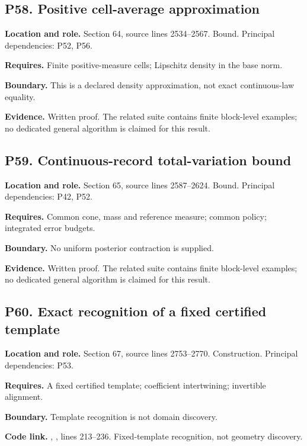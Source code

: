 \documentclass[11pt,letterpaper]{article}
\begin{document}
\par\noindent\begin{minipage}{\textwidth}
\subsection{P58. Positive cell-average
approximation}\label{p58.-positive-cell-average-approximation}

\textbf{Location and role.} Section 64, source lines 2534--2567. Bound.
Principal dependencies: P52, P56.

\textbf{Requires.} Finite positive-measure cells; Lipschitz density in
the base norm.

\textbf{Boundary.} This is a declared density approximation, not exact
continuous-law equality.

\textbf{Evidence.} Written proof. The related suite contains finite
block-level examples; no dedicated general algorithm is claimed for this
result.
\end{minipage}\par\medskip

\par\noindent\begin{minipage}{\textwidth}
\subsection{P59. Continuous-record total-variation
bound}\label{p59.-continuous-record-total-variation-bound}

\textbf{Location and role.} Section 65, source lines 2587--2624. Bound.
Principal dependencies: P42, P52.

\textbf{Requires.} Common cone, mass and reference measure; common
policy; integrated error budgets.

\textbf{Boundary.} No uniform posterior contraction is supplied.

\textbf{Evidence.} Written proof. The related suite contains finite
block-level examples; no dedicated general algorithm is claimed for this
result.
\end{minipage}\par\medskip

\par\noindent\begin{minipage}{\textwidth}
\subsection{P60. Exact recognition of a fixed certified
template}\label{p60.-exact-recognition-of-a-fixed-certified-template}

\textbf{Location and role.} Section 67, source lines 2753--2770.
Construction. Principal dependencies: P53.

\textbf{Requires.} A fixed certified template; coefficient intertwining;
invertible alignment.

\textbf{Boundary.} Template recognition is not domain discovery.

\textbf{Code link.} ,
, lines 213--236. Fixed-template
recognition, not geometry discovery.
\end{minipage}\par\medskip
\end{document}
